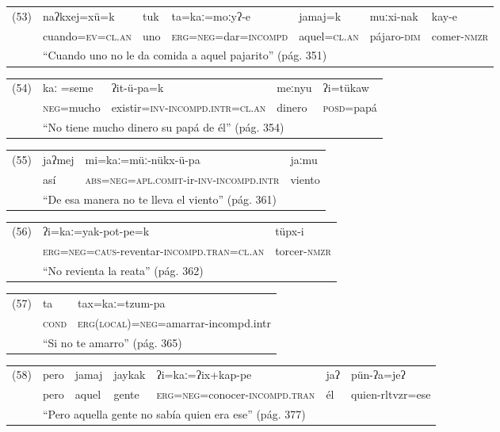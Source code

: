 {\setmainfont{Doulos SIL}

{\small
\noindent \begin{tabular}{lllllll}
(53) & naʔkxej=xü=k & tuk & ta=kaː=moːyʔ-e & jamaj=k & muːxi-nak & kay-e \\
& cuando=\textsc{ev=cl.an} & uno & \textsc{erg=neg}=dar=\textsc{incompd} & aquel=\textsc{cl.an} & pájaro-\textsc{dim} & comer-\textsc{nmzr} \\
& \multicolumn{6}{l}{``Cuando uno no le da comida a aquel pajarito'' (pág. 351)}
\end{tabular} \vspace{0.3cm}
}

\begin{tabular}{lllll}
(54) & kaː =seme & ʔit-ü-pa=k & meːnyu & ʔi=tükaw \\
& \textsc{neg}=mucho & existir=\textsc{inv-incompd.intr=cl.an} & dinero & \textsc{posd}=papá \\
& \multicolumn{4}{l}{``No tiene mucho dinero su papá de él'' (pág. 354)}
\end{tabular} \vspace{0.3cm}

\begin{tabular}{llll}
(55) & jaʔmej & mi=kaː=müː-nükx-ü-pa & jaːmu \\
& así & \textsc{abs=neg=apl.comit}-ir-\textsc{inv-incompd.intr} & viento \\
& \multicolumn{3}{l}{``De esa manera no te lleva el viento'' (pág. 361)}
\end{tabular} \vspace{0.3cm}

\begin{tabular}{lll}
(56) & ʔi=kaː=yak-pot-pe=k & tüpx-i \\
& \textsc{erg=neg=caus}-reventar-\textsc{incompd.tran=cl.an} & torcer-\textsc{nmzr}\\
& \multicolumn{2}{l}{``No revienta la reata'' (pág. 362)}
\end{tabular} \vspace{0.3cm}

\begin{tabular}{lll}
(57) & ta & tax=kaː=tzum-pa \\
& \textsc{cond} & \textsc{erg(local)=neg}=amarrar-incompd.intr \\
& \multicolumn{2}{l}{``Si no te amarro'' (pág. 365)}
\end{tabular} \vspace{0.3cm}

{\small
\noindent \begin{tabular}{lllllll}
(58) & pero & jamaj & jaykak & ʔi=kaː=ʔix+kap-pe & jaʔ & pün-ʔa=jeʔ \\
& pero & aquel & gente & \textsc{erg=neg=}conocer-\textsc{incompd.tran} & él & quien-rltvzr=ese \\
& \multicolumn{6}{l}{``Pero aquella gente no sabía quien era ese'' (pág. 377)}
\end{tabular} \vspace{0.3cm}
}

}

